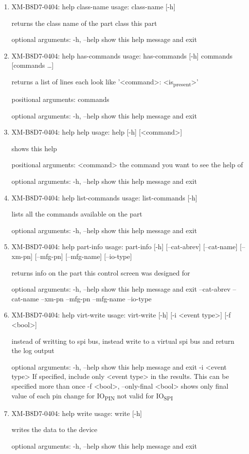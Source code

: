 \documentclass[11pt]{article}
\begin{document}
\begin{enumerate}
\item XM-B8D7-0404: help class-name
\label{sec:org4288e4b}
usage: class-name [-h]

returns the class name of the part class this part

optional arguments:
  -h, --help  show this help message and exit

\item XM-B8D7-0404: help has-commands
\label{sec:orgf1ff6c9}
usage: has-commands [-h] commands [commands \ldots{}]

returns a list of lines each look like '<command>: <is\textsubscript{present}>'

positional arguments:
  commands

optional arguments:
  -h, --help  show this help message and exit

\item XM-B8D7-0404: help help
\label{sec:org848d2f3}
usage: help [-h] [<command>]

shows this help

positional arguments:
  <command>   the command you want to see the help of

optional arguments:
  -h, --help  show this help message and exit

\item XM-B8D7-0404: help list-commands
\label{sec:org87f6be2}
usage: list-commands [-h]

lists all the commands available on the part

optional arguments:
  -h, --help  show this help message and exit

\item XM-B8D7-0404: help part-info
\label{sec:org53cbace}
usage: part-info  [-h] [--cat-abrev] [--cat-name] [--xm-pn] [--mfg-pn] [--mfg-name]
        [--io-type]

returns info on the part this control screen was designed for

optional arguments:
  -h, --help   show this help message and exit
  --cat-abrev
  --cat-name
  --xm-pn
  --mfg-pn
  --mfg-name
  --io-type

\item XM-B8D7-0404: help virt-write
\label{sec:orgf0dd24d}
usage: virt-write [-h] [-i <event type>] [-f <bool>]

instead of writting to spi bus, instead write to a virtual spi bus and return
the log output

optional arguments:
  -h, --help            show this help message and exit
  -i <event type>       If specified, include only <event type> in the
                        results. This can be specified more than once
  -f <bool>, --only-final <bool>
                        shows only final value of each pin change for IO\textsubscript{PIN}
                        not valid for IO\textsubscript{SPI}

\item XM-B8D7-0404: help write
\label{sec:orgfbb1e77}
usage: write [-h]

writes the data to the device

optional arguments:
  -h, --help  show this help message and exit
\end{enumerate}
\end{document}
